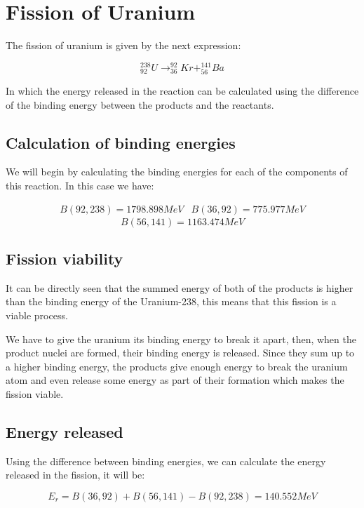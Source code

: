 \documentclass{article} %
\begin{document}
\section{Fission of Uranium}

The fission of uranium is given by the next expression:

\begin{equation}
^{238}_{92}U \rightarrow ^{92}_{36}Kr + ^{141}_{56}Ba
\end{equation}

In which the energy released in the reaction can be calculated using the difference of the binding energy between the products and the reactants.

\subsection{Calculation of binding energies}

We will begin by calculating the binding energies for each of the components of this reaction. In this case we have:

$$
\begin{array}{cc}
B(92, 238) = 1798.898 MeV & B(36, 92) = 775.977 MeV
\end{array}
$$
$$
B(56, 141) = 1163.474 MeV
$$

\subsection{Fission viability}

It can be directly seen that the summed energy of both of the products is higher than the binding energy of the Uranium-238, this means that this fission is a viable process.

We have to give the uranium its binding energy to break it apart, then, when the product nuclei are formed, their binding energy is released. Since they sum up to a higher binding energy, the products give enough energy to break the uranium atom and even release some energy as part of their formation which makes the fission viable.

\subsection{Energy released}

Using the difference between binding energies, we can calculate the energy released in the fission, it will be:

$$
E_r = B(36, 92) + B(56, 141) - B(92, 238) = 140.552 MeV
$$
\end{document}
